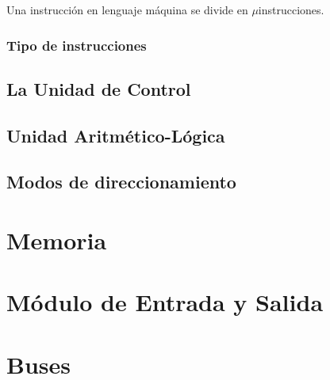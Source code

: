 \documentclass[a4paper, 11pt, titlepage]{article}
\begin{document}
            Una instrucción en lenguaje máquina se divide en $\mu$instrucciones.

        \subsubsection{Tipo de instrucciones}

    \subsection{La Unidad de Control}\label{unidadcontrol}

    \subsection{Unidad Aritmético-Lógica}

    \subsection{Modos de direccionamiento}

\section{Memoria}\label{memoria}
\section{Módulo de Entrada y Salida}\label{entradasalida}
\section{Buses}
\end{document}
